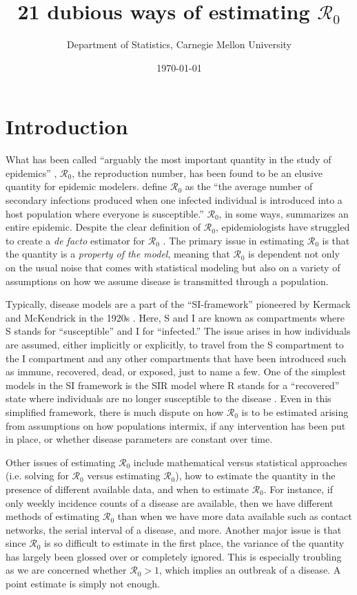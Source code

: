 \documentclass[12pt]{article}
\newcommand{\XX}{21 } %
\newcommand{\rr}{\ensuremath{\mathcal{R}_0}}
\begin{document}
\title{\XX dubious ways of estimating $\rr$}
\author{ Department of Statistics, Carnegie Mellon University}
\date{\today}
\maketitle

\tableofcontents

\section{Introduction}\label{sec:intro}
What has been called ``arguably the most important quantity in the study of epidemics'' \cite{Heesterbeek2002}, $\mathcal{R}_0$, the reproduction number, has been found to be an elusive quantity for epidemic modelers.  \citet{anderson1992} define $\rr$ as the ``the average number of secondary infections produced when one infected individual is introduced into a host population where everyone is susceptible.''  $\rr$, in some ways, summarizes an entire epidemic.  Despite the clear definition of $\rr$, epidemiologists have struggled to create a \textit{de facto} estimator for $\rr$  \citep{hethcote2000}.  The primary issue in estimating $\rr$ is that the quantity is a \textit{property of the model}, meaning that $\rr$ is dependent not only on the usual noise that comes with statistical modeling but also on a variety of assumptions on how we assume disease is transmitted through a population.

Typically, disease models are a part of the ``SI-framework'' pioneered by Kermack and McKendrick in the 1920s \citep{getz2006}.  Here, S and I are known as compartments where S stands for ``susceptible'' and I for ``infected.''  The issue arises in how individuals are assumed, either implicitly or explicitly, to travel from the S compartment to the I compartment and any other compartments that have been introduced such as immune, recovered, dead, or exposed, just to name a few.  One of the simplest models in the SI framework is the SIR model where R stands for a ``recovered'' state where individuals are no longer susceptible to the disease \citep{Kermack700}.  Even in this simplified framework, there is much dispute on how $\rr$ is to be estimated arising from assumptions on how populations intermix, if any intervention has been put in place, or whether disease parameters are constant over time.

Other issues of estimating $\rr$ include mathematical versus statistical approaches (i.e. solving for $\rr$ versus estimating $\rr$), how to estimate the quantity in the presence of different available data, and when to estimate $\rr$.  For instance, if only weekly incidence counts of a disease are available, then we have different methods of estimating $\rr$ than when we have more data available such as contact networks, the serial interval of a disease, and more.  Another major issue is that since $\rr$ is so difficult to estimate in the first place, the variance of the quantity has largely been glossed over or completely ignored.  This is especially troubling as we are concerned whether $\rr > 1$, which implies an outbreak of a disease.  A point estimate is simply not enough.
\end{document}
